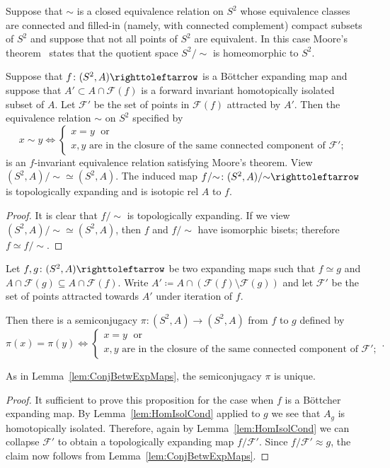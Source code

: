 \documentclass{amsart}
\newcommand\Fatou{{\mathcal F}}
\begin{document}
Suppose that $\sim$ is a closed equivalence relation on $S^2$ whose
equivalence classes are connected and filled-in (namely, with
connected complement) compact subsets of $S^2$ and suppose that not
all points of $S^2$ are equivalent. In this case Moore's
theorem~\cite{moore:sphere} states that the quotient space $S^2/{\sim}$
is homeomorphic to $S^2$.

\begin{cor}
  Suppose that $f\colon (S^2,A)\selfmap$ is a B\"ottcher expanding map
  and suppose that $A'\subset A\cap \Fatou(f)$ is a forward invariant
  homotopically isolated subset of $A$. Let $\Fatou'$ be the set of
  points in $ \Fatou(f)$ attracted by $A'$. Then the equivalence
  relation $\sim$ on $S^2$ specified by
  \[x\sim y\Longleftrightarrow \begin{cases}
      x=y \;\text{ or }\\
      x,y\text{ are in the closure of the same connected component of
      }\Fatou';
    \end{cases}
  \]
  is an $f$-invariant equivalence relation satisfying Moore's
  theorem. View $(S^2,A)/{\sim} \simeq (S^2,A)$. The induced map
  $f/{\sim}\colon (S^2,A)/{\sim} \selfmap $ is topologically expanding and is isotopic
  rel $A$ to $f$.
\end{cor}
\begin{proof}
  It is clear that $f/{\sim}$ is topologically expanding. If we view
  $(S^2,A)/{\sim} \simeq (S^2,A)$, then $f$ and $f/{\sim}$ have isomorphic
  bisets; therefore $f\simeq f/{\sim}$.
\end{proof}

\begin{prop}\label{prop:semiconjugate}
  Let $f,g\colon (S^2,A)\selfmap$ be two expanding maps such that
  $f\simeq g$ and $A\cap\Fatou(g)\subseteq A\cap\Fatou(f)$. Write
  $A'\coloneqq A\cap (\Fatou(f)\setminus \Fatou(g))$ and let $\Fatou'$
  be the set of points attracted towards $A'$ under iteration of $f$.

  Then there is a semiconjugacy $\pi\colon (S^2,A)\to (S^2,A)$ from
  $f$ to $g$ defined by
  \[\pi(x)=\pi(y)\Longleftrightarrow  \begin{cases}
 x=y \;\text{ or }\\
 x,y\text{ are in the closure of the same connected component of
    }\Fatou';
\end{cases}.\]
\end{prop}
As in Lemma~\ref{lem:ConjBetwExpMaps}, the semiconjugacy $\pi$ is
unique.
\begin{proof}
  It sufficient to prove this proposition for the case when $f$ is a
  B\"ottcher expanding map.  By Lemma~\ref{lem:HomIsolCond} applied to
  $g$ we see that $A_g$ is homotopically isolated. Therefore, again by
  Lemma~\ref{lem:HomIsolCond} we can collapse $\Fatou'$ to obtain a
  topologically expanding map $f/\Fatou'$. Since $f/\Fatou'\approx g$,
  the claim now follows from Lemma~\ref{lem:ConjBetwExpMaps}.
\end{proof}
\end{document}
